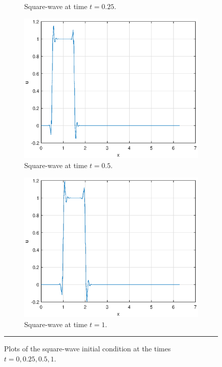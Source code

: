 \documentclass[a4paper, 12pt]{article}
\begin{document}
\begin{figure}[H]
\begin{subfigure}[b]{0.5\textwidth}
\caption{Square-wave at time $t=0.25$.}%
\end{subfigure}
\begin{subfigure}[b]{0.5\textwidth}
\includegraphics[width=\textwidth]{Q2t=0.5}\hfill
\caption{Square-wave at time $t=0.5$.}%
\end{subfigure}
\begin{subfigure}[b]{0.5\textwidth}
\includegraphics[width=\textwidth]{Q2t=1}\hfill
\caption{Square-wave at time $t=1$.}%
\end{subfigure}
\caption{Plots of the square-wave initial condition at the times $t=0,0.25,0.5,1$.}
\rule{\linewidth}{.4pt}
\end{figure}
\end{document}
